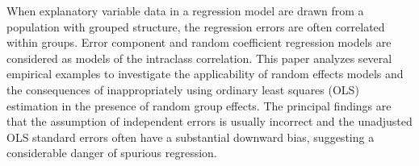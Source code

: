 When explanatory variable data in a regression model are drawn from a population with grouped structure, the regression errors are often correlated within groups. Error component and random coefficient regression models are considered as models of the intraclass correlation. This paper analyzes several empirical examples to investigate the applicability of random effects models and the consequences of inappropriately using ordinary least squares (OLS) estimation in the presence of random group effects. The principal findings are that the assumption of independent errors is usually incorrect and the unadjusted OLS standard errors often have a substantial downward bias, suggesting a considerable danger of spurious regression.